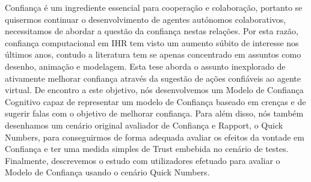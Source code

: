 \noindent Confiança é um ingrediente essencial para cooperação e colaboração, portanto se quisermos continuar o desenvolvimento de agentes autónomos colaborativos, necessitamos de abordar a questão da confiança nestas relações. Por esta razão, confiança computacional em \ac{IHR} tem visto um aumento súbito de interesse nos últimos anos, contudo a literatura tem se apenas concentrado em assuntos como desenho, animação e modelagem. Esta tese aborda o assunto inexplorado de ativamente melhorar confiança através da sugestão de ações confiáveis ao agente virtual. De encontro a este objetivo, nós desenvolvemos um Modelo de Confiança Cognitivo capaz de representar um modelo de Confiança baseado em crenças e de sugerir falas com o objetivo de melhorar confiança. Para além disso, nós também desenhamos um cenário original avaliador de Confiança e Rapport, o Quick Numbers, para conseguirmos de forma adequada avaliar os efeitos da vontade em Confiança e ter uma medida simples de Trust embebida no cenário de testes. Finalmente, descrevemos o estudo com utilizadores efetuado para avaliar o Modelo de Confiança usando o cenário Quick Numbers.